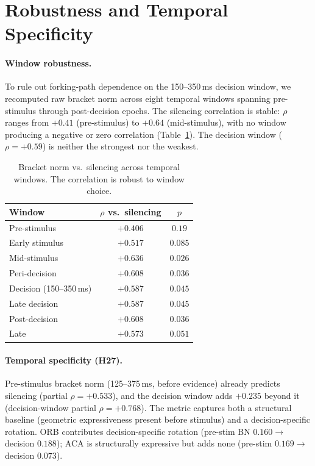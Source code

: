 \documentclass[9pt,lineno]{elife}
\begin{document}



\clearpage
\appendix

\section{Robustness and Temporal Specificity}
\label{app:robustness}

\paragraph{Window robustness.} To rule out forking-path dependence on the 150--350\,ms decision window, we recomputed raw bracket norm across eight temporal windows spanning pre-stimulus through post-decision epochs. The silencing correlation is stable: $\rho$ ranges from $+0.41$ (pre-stimulus) to $+0.64$ (mid-stimulus), with no window producing a negative or zero correlation (Table~\ref{tab:windows}). The decision window ($\rho = +0.59$) is neither the strongest nor the weakest.

\begin{table}[h]
\centering
\caption{Bracket norm vs.\ silencing across temporal windows. The correlation is robust to window choice.}
\label{tab:windows}
\small
\begin{tabular}{lcc}
\toprule
Window & $\rho$ vs.\ silencing & $p$ \\
\midrule
Pre-stimulus & $+0.406$ & $0.19$ \\
Early stimulus & $+0.517$ & $0.085$ \\
Mid-stimulus & $+0.636$ & $0.026$ \\
Peri-decision & $+0.608$ & $0.036$ \\
Decision (150--350\,ms) & $+0.587$ & $0.045$ \\
Late decision & $+0.587$ & $0.045$ \\
Post-decision & $+0.608$ & $0.036$ \\
Late & $+0.573$ & $0.051$ \\
\bottomrule
\end{tabular}
\end{table}

\paragraph{Temporal specificity (H27).} Pre-stimulus bracket norm (125--375\,ms, before evidence) already predicts silencing (partial $\rho = +0.533$), and the decision window adds $+0.235$ beyond it (decision-window partial $\rho = +0.768$). The metric captures both a structural baseline (geometric expressiveness present before stimulus) and a decision-specific rotation. ORB contributes decision-specific rotation (pre-stim BN $0.160 \to$ decision $0.188$); ACA is structurally expressive but adds none (pre-stim $0.169 \to$ decision $0.073$).
\end{document}
